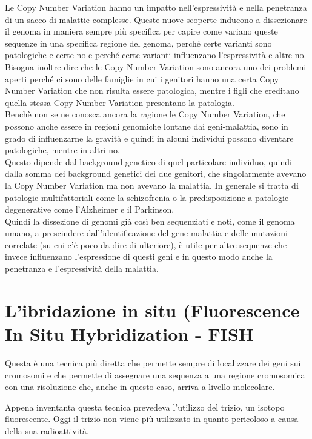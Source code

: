 \documentclass[11pt]{book}
\begin{document}
Le Copy Number Variation hanno un impatto nell’espressività e nella penetranza di un sacco di malattie complesse. Queste nuove scoperte inducono a dissezionare il genoma in maniera sempre più specifica per capire come variano queste sequenze in una specifica regione del genoma, perché certe varianti sono patologiche e certe no e perché certe varianti influenzano l’espressività e altre no.\\
Bisogna inoltre dire che le Copy Number Variation sono ancora uno dei problemi aperti perché ci sono delle famiglie in cui i genitori hanno una certa Copy Number Variation che non risulta essere patologica, mentre i figli che ereditano quella stessa Copy Number Variation presentano la patologia.\\
Benchè non se ne conosca ancora la ragione le Copy Number Variation, che possono anche essere in regioni genomiche lontane dai geni-malattia, sono in grado di influenzarne la gravità e quindi in alcuni individui possono diventare patologiche, mentre in altri no.\\
Questo dipende dal background genetico di quel particolare individuo, quindi dalla somma dei background genetici dei due genitori, che singolarmente avevano la Copy Number Variation ma non avevano la malattia.
In generale si tratta di patologie multifattoriali come la schizofrenia o la predisposizione a patologie degenerative come l’Alzheimer e il Parkinson.\\
Quindi la dissezione di genomi già così ben sequenziati e noti, come il genoma umano, a prescindere dall’identificazione del gene-malattia e delle mutazioni correlate (su cui c’è poco da dire di ulteriore), è utile per altre sequenze che invece influenzano l’espressione di questi geni e in questo modo anche la penetranza e l’espressività della malattia.



\section{L'ibridazione in situ (Fluorescence In Situ Hybridization - FISH}

Questa è una tecnica più diretta che permette sempre di localizzare dei geni sui cromosomi e che permette di assegnare una sequenza a una regione cromosomica con una risoluzione che, anche in questo caso, arriva a livello molecolare.

Appena inventanta questa tecnica prevedeva l'utilizzo del trizio, un isotopo fluorescente. Oggi il trizio non viene più utilizzato in quanto pericoloso a causa della sua radioattività.
\end{document}
